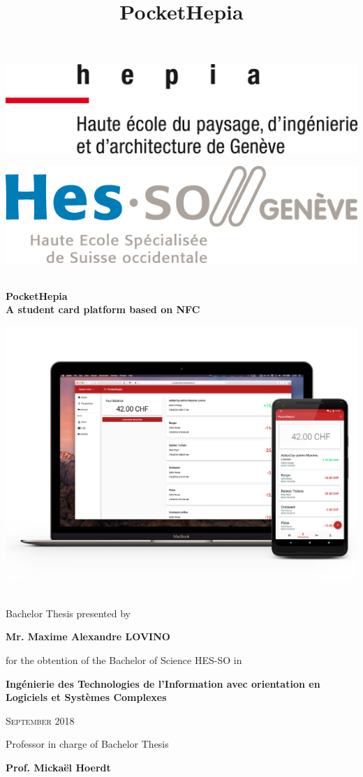 \documentclass[twoside, openright,11pt,a4paper]{book}
\title{PocketHepia}
\begin{document}
\begin{titlepage}
	\centering
	\begin{minipage}{.5\textwidth}
		\centering
		\includegraphics[width=.7\linewidth]{assets/logo_hepia.png}
	\end{minipage}%
	\begin{minipage}{.5\textwidth}
		\centering
		\includegraphics[width=.7\linewidth]{assets/logo_hes.png}
	\end{minipage}
	\vspace{1cm}
	{\huge\bfseries \\PocketHepia\\A student card platform based on NFC \par}
			\vspace{0.5cm}
			\includegraphics[width=.8\linewidth]{assets/app_presentation}
			\vspace{0.2cm}
	{\Large \\Bachelor Thesis presented by \par}
				\vspace{0.2cm}
		{\Large \bfseries Mr. Maxime Alexandre LOVINO\par}
				\vspace{0.2cm}
			{\Large for the obtention of the Bachelor of Science HES-SO in \par}
				\vspace{0.2cm}
			{\Large \bfseries Ingénierie des Technologies de l’Information avec orientation en
Logiciels et Systèmes Complexes \par}	
	\vspace{0.5cm}
	{\scshape\Large September 2018\par}
	\vfill
	\raggedright
	Professor in charge of Bachelor Thesis\par
	{\bfseries Prof. Mickaël Hoerdt}
	\vfill
\end{titlepage}
\end{document}
